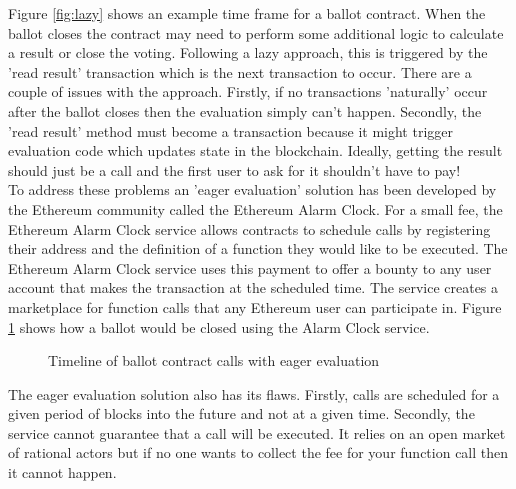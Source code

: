 Figure \ref{fig:lazy} shows an example time frame for a ballot contract. When the ballot closes the contract may need to perform some additional logic to calculate a result or close the voting. Following a lazy approach, this is triggered by the 'read result' transaction which is the next transaction to occur. There are a couple of issues with the approach. Firstly, if no transactions 'naturally' occur after the ballot closes then the evaluation simply can't happen. Secondly, the 'read result' method must become a transaction because it might trigger evaluation code which updates state in the blockchain. Ideally, getting the result should just be a call and the first user to ask for it shouldn't have to pay!\\

To address these problems an 'eager evaluation' solution has been developed by the Ethereum community called the Ethereum Alarm Clock\cite{EthereumAlarmClock}. For a small fee, the Ethereum Alarm Clock service allows contracts to schedule calls by registering their address and the definition of a function they would like to be executed. The Ethereum Alarm Clock service uses this payment to offer a bounty to any user account that makes the transaction at the scheduled time. The service creates a marketplace for function calls that any Ethereum user can participate in. Figure \ref{fig:eager} shows how a ballot would be closed using the Alarm Clock service.\\

\begin{figure}
\centering
{}
\decoRule
\caption[Eager Contract Scheduling]{Timeline of ballot contract calls with eager evaluation}
\label{fig:eager}
\end{figure}
The eager evaluation solution also has its flaws. Firstly, calls are scheduled for a given period of blocks into the future and not at a given time. Secondly, the service cannot guarantee that a call will be executed. It relies on an open market of rational actors but if no one wants to collect the fee for your function call then it cannot happen.\\

